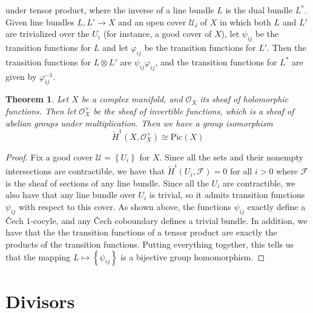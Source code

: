 \documentclass[psamsfonts, 12pt]{amsart}
\newtheorem{thm}{Theorem}[section]
\theoremstyle{definition}
\theoremstyle{remark}
\renewcommand{\O}{\mathcal{O}}
\newcommand{\inv}{^{-1}}
\newcommand{\set}[1]{\left\lbrace #1 \right\rbrace}
\begin{document}
under tensor product, where the inverse of a line bundle $L$ is the dual bundle
$L^*$. Given line bundles $L,L' \to X$ and an open cover $\mathcal{U_i}$ of $X$
in which both $L$ and $L'$ are trivialized over the $U_i$ (for instance, a good cover
of $X$), let $\psi_{ij}$ be the transition functions for $L$ and let $\varphi_{ij}$
be the transition functions for $L'$. Then the transition functions for $L\otimes L'$
are $\psi_{ij}\varphi_{ij}$, and the transition functions for $L^*$ are given
by $\varphi_{ij}\inv$.
%
\begin{thm}
Let $X$ be a complex manifold, and $\O_X$ its sheaf of holomorphic functions.
Then let $\O_X^\times$ be the sheaf of invertible functions, which is a
sheaf of abelian groups under multiplication. Then we have a group isomorphism
\[
\check{H}^1(X,\O_X^\times) \cong \mathrm{Pic}(X)
\]
\end{thm}
%
\begin{proof}
Fix a good cover $\mathcal{U} = \set{U_i}$ for $X$. Since all the sets and their
nonempty intersections are contractible, we have that
$\check{H}^i(U_i, \mathcal{F}) = 0$ for all $i > 0$ where $\mathcal{F}$ is the sheaf
of sections of any line bundle. Since all the $U_i$ are contractible, we also
have that any line bundle over $U_i$ is trivial, so it admits transition
functions $\psi_{ij}$ with respect to this cover. As shown above, the
functions $\psi_{ij}$ exactly define a \v{C}ech $1$-cocyle, and any
\v{C}ech coboundary defines a trivial bundle. In addition, we have that
the the transition functions of a tensor product are exactly the products
of the transition functions. Putting everything together, this tells us that
the mapping $L \mapsto \set{\psi_{ij}}$ is a bijective group homomorphism.
\end{proof}
%
\section{Divisors}
%
%
\end{document}
